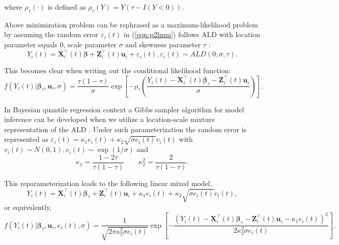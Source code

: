 \noindent where $\rho_{\tau}(\cdot)$ is defined as $\rho_{\tau}(Y)=Y(\tau-{I}{(Y<0)}).$

Above minimization problem can be rephrased as a maximum-likelihood problem by assuming the random error $\varepsilon_{i}(t)$ in (\ref{eqn:p2lmm}) follows ALD with location parameter equals 0, scale parameter $\sigma$ and skewness parameter $\tau$ \citep{koenker1999goodness,yu2001bayesian}:
\begin{equation*}
Y_{i}(t) ={\boldsymbol X}_{i}^{\top}(t) \boldsymbol{\beta}+ {\boldsymbol Z}_{i}^{\top}(t)\boldsymbol{u}_i + \varepsilon_{i}(t), \varepsilon_{i}(t)\sim ALD(0, \sigma, \tau).
\end{equation*}

This becomes clear when writing out the conditional likelihood function:
\begin{equation*}\label{eqn:p2ald_lqmm}
f(Y_{i}(t)|\boldsymbol{\beta}_{\tau},\boldsymbol{u}_i,\sigma)=\frac{\tau(1-\tau)}{\sigma}\exp\left[-\rho_{\tau}\left(\frac{Y_{i}(t)-{\boldsymbol X}_{i}^{\top}(t)\boldsymbol{\beta}_{\tau}-{\boldsymbol Z}_{i}^{\top}(t)\boldsymbol{u}_i}{\sigma}\right)\right].
\end{equation*}

In Bayesian quantile regression context a Gibbs sampler algorithm for model inference can be developed when we utilize a location-scale mixture representation of the ALD \citep{kotz2001laplace}. Under such parameterization the random error is represented as $\varepsilon_{i}(t)=\kappa_1e_{i}(t)+\kappa_2\sqrt{\sigma e_{i}(t)}v_{i}(t)$ with $v_{i}(t)\sim N(0,1), e_{i}(t)\sim\exp(1/\sigma)$ and
\[\kappa_1=\frac{1-2\tau}{\tau(1-\tau)}\hspace{2em} \kappa_2^2=\frac{2}{\tau(1-\tau)}.\]


This reparameterization leads to the following linear mixed model,
\begin{equation*}\label{eqn:p2reformald2}
Y_{i}(t)={\boldsymbol X}_{i}^{\top}(t)\boldsymbol{\beta}_{\tau}+{\boldsymbol Z}_{i}^{\top}(t)\boldsymbol{u}_i+\kappa_1e_{i}(t)+\kappa_2\sqrt{\sigma e_{i}(t)}v_{i}(t),
\end{equation*}
\noindent or equivalently,
{\small
\begin{equation}\label{eqn:p2lo_sc_lh}
f(Y_{i}(t)|\boldsymbol{\beta}_{\tau},\boldsymbol{u}_i,e_{i}(t),\sigma)=\frac{1}{\sqrt{2\pi\kappa_2^2\sigma e_{i}(t)}}\exp\left[-\frac{(Y_{i}(t)-{\boldsymbol X}_{i}^{\top}(t)\boldsymbol{\beta}_{\tau}-{\boldsymbol Z}_{i}^{\top}(t)\boldsymbol{u}_i-\kappa_1e_{i}(t))^2}{2\kappa_2^2\sigma e_{i}(t)}\right].
\end{equation}
}

